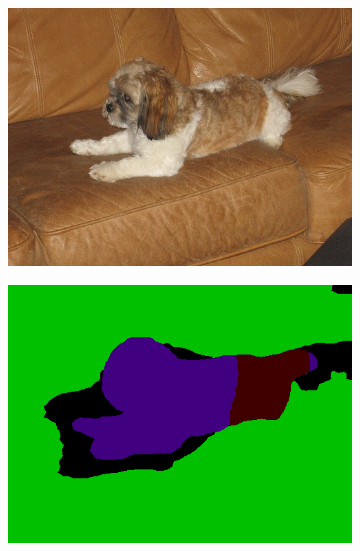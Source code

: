 \documentclass{article} %
\begin{document}
\begin{figure}[t]
    \centering
  \begin{subfigure}[b]{0.19\linewidth}
    \includegraphics[width=\textwidth]{figs/ab/img/2007_008260}
  \end{subfigure}
  \begin{subfigure}[b]{0.19\linewidth}
    \includegraphics[width=\textwidth]{figs/ab/step8/2007_008260}
  \end{subfigure}
  \begin{subfigure}[b]{0.19\linewidth}

\end{subfigure}
\end{figure}
\end{document}
